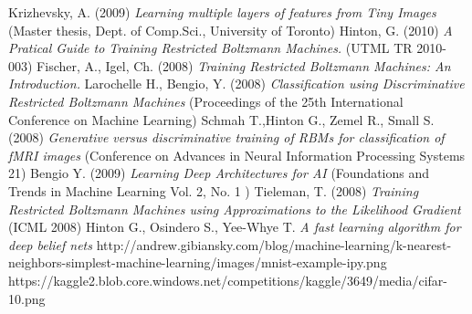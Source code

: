 \documentclass[a4paper]{scrartcl}
\begin{document}
\begin{thebibliography}{9}
    Krizhevsky, A. (2009) \emph{Learning multiple layers of features 	from Tiny Images} (Master thesis, Dept. of Comp.Sci., University of Toronto)
    Hinton, G. (2010) \emph{A Pratical Guide to Training Restricted 			Boltzmann Machines.} (UTML TR 2010-003)
    Fischer, A., Igel, Ch. (2008) \emph{Training Restricted Boltzmann 		Machines: An Introduction.} 
    Larochelle H., Bengio, Y. (2008) \emph {Classification using 			Discriminative Restricted Boltzmann Machines} (Proceedings of the 25th International 			Conference on Machine Learning)
    Schmah T.,Hinton G., Zemel R., Small S. (2008) \emph{Generative 			versus discriminative training of RBMs
	for classification of fMRI images} (Conference on Advances in Neural Information 				Processing Systems 21)
    Bengio Y. (2009) \emph {Learning Deep Architectures for AI} 				(Foundations and Trends in Machine Learning
	Vol. 2, No. 1 )
    Tieleman, T. (2008) \emph{Training Restricted Boltzmann Machines 		using Approximations to
	the Likelihood Gradient} (ICML 2008)	
    Hinton G., Osindero S., Yee-Whye T. \emph {A fast learning 			algorithm for deep belief nets}
    http://andrew.gibiansky.com/blog/machine-learning/k-nearest-		neighbors-simplest-machine-learning/images/mnist-example-ipy.png
    https://kaggle2.blob.core.windows.net/competitions/kaggle/3649/media/cifar-10.png
\end{thebibliography}
\end{document}

